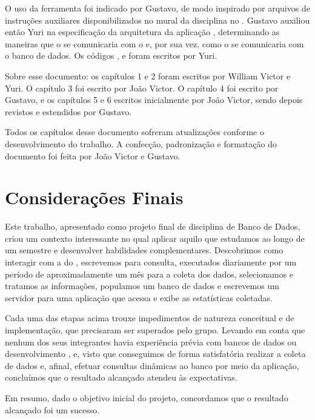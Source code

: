   O uso da ferramenta  foi indicado por Gustavo, de modo inspirado por arquivos de instruções auxiliares disponibilizados no mural da disciplina no . Gustavo auxiliou então Yuri na especificação da arquitetura da aplicação , determinando as maneiras que o  se comunicaria com o
   e, por sua vez, como o  se comunicaria com o banco de dados. Os códigos ,  e  foram escritos por Yuri.

  Sobre esse documento: os capítulos 1 e 2 foram escritos por William Victor e Yuri. O capítulo 3 foi escrito por João Victor. O capítulo 4 foi escrito por Gustavo, e os capítulos 5 e 6 escritos inicialmente por João Victor, sendo depois revistos e estendidos por Gustavo.

  Todos os capítulos desse documento sofreram atualizações conforme o desenvolvimento do trabalho. A confecção, padronização e formatação do documento foi feita por João Victor e Gustavo.


\chapter{Considerações Finais}

  Este trabalho, apresentado como projeto final de disciplina de Banco de Dados, criou um contexto interessante no qual aplicar aquilo que estudamos ao longo de um semestre e desenvolver habilidades complementares. Descobrimos como interagir com a  do , escrevemos  para consulta, executados diariamente por um período de aproximadamente um mês para a coleta dos dados, selecionamos e tratamos as informações, populamos um banco de dados  e escrevemos um servidor para uma aplicação  que acessa e exibe as estatísticas coletadas.

  Cada uma das etapas acima trouxe impedimentos de natureza conceitual e de implementação, que precisaram ser superados pelo grupo. Levando em conta que nenhum dos seus integrantes havia experiência prévia com bancos de dados ou desenvolvimento , e, visto que conseguimos de forma satisfatória realizar a coleta de dados e, afinal, efetuar consultas dinâmicas ao banco por meio da aplicação, concluímos que o resultado alcançado atendeu às expectativas.

  Em resumo, dado o objetivo inicial do projeto, concordamos que o resultado alcançado foi um sucesso.

